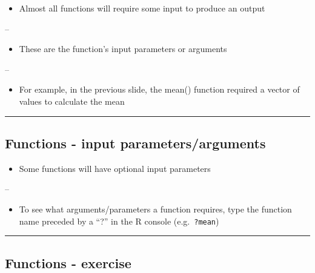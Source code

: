\documentclass[]{article}
\providecommand{\tightlist}{%
  \setlength{\itemsep}{0pt}\setlength{\parskip}{0pt}}
\begin{document}
\begin{itemize}
\tightlist
\item
  Almost all functions will require some input to produce an output
\end{itemize}

--

\begin{itemize}
\tightlist
\item
  These are the function's input parameters or arguments
\end{itemize}

--

\begin{itemize}
\tightlist
\item
  For example, in the previous slide, the mean() function required a
  vector of values to calculate the mean
\end{itemize}

\begin{center}\rule{0.5\linewidth}{\linethickness}\end{center}

\hypertarget{functions---input-parametersarguments-1}{%
\subsection{Functions - input
parameters/arguments}\label{functions---input-parametersarguments-1}}

\begin{itemize}
\tightlist
\item
  Some functions will have optional input parameters
\end{itemize}

--

\begin{itemize}
\tightlist
\item
  To see what arguments/parameters a function requires, type the
  function name preceded by a ``?'' in the R console
  (e.g.~\texttt{?mean})
\end{itemize}

\begin{center}\rule{0.5\linewidth}{\linethickness}\end{center}

\hypertarget{functions---exercise}{%
\subsection{Functions - exercise}\label{functions---exercise}}
\end{document}
